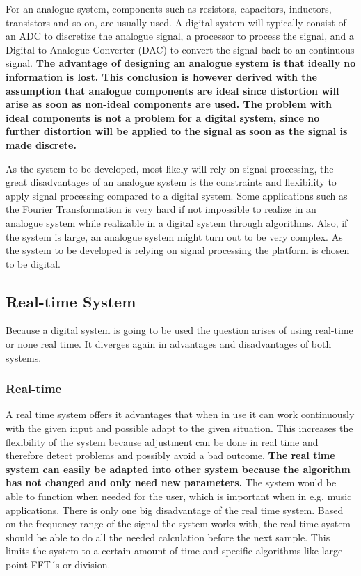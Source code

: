 For an analogue system, components such as resistors, capacitors, inductors, transistors and so on, are usually used. A digital system will typically consist of an ADC to discretize the analogue signal, a processor to process the signal, and a Digital-to-Analogue Converter (DAC) to convert the signal back to an continuous signal. \textbf{The advantage of designing an analogue system is that ideally no information is lost. This conclusion is however derived with the assumption that analogue components are ideal since distortion will arise as soon as non-ideal components are used. The problem with ideal components is not a problem for a digital system, since no further distortion will be applied to the signal as soon as the signal is made discrete.}

As the system to be developed, most likely will rely on signal processing, the great disadvantages of an analogue system is the constraints and flexibility to apply signal processing compared to a digital system. Some applications such as the Fourier Transformation is very hard if not impossible to realize in an analogue system while realizable in a digital system through algorithms. Also, if the system is large, an analogue system might turn out to be very complex.%
As the system to be developed is relying on signal processing the platform is chosen to be digital.

\subsection{Real-time System}
Because a digital system is going to be used the question arises of using real-time or none real time. It diverges again in advantages and disadvantages of both systems. %

\subsubsection*{Real-time}
A real time system offers it advantages that when in use it can work continuously with the given input and possible adapt to the given situation. This increases the flexibility of the system because adjustment can be done in real time and therefore detect problems and possibly avoid a bad outcome. \textbf{The real time system can easily be adapted into other system because the algorithm has not changed and only need new parameters.} The system would be able to function when needed for the user, which is important when in e.g. music applications. There is only one big disadvantage of the real time system. Based on the frequency range of the signal the system works with, the real time system should be able to do all the needed calculation before the next sample. This limits the system to a certain amount of time and specific algorithms like large point FFT´s or division. %

